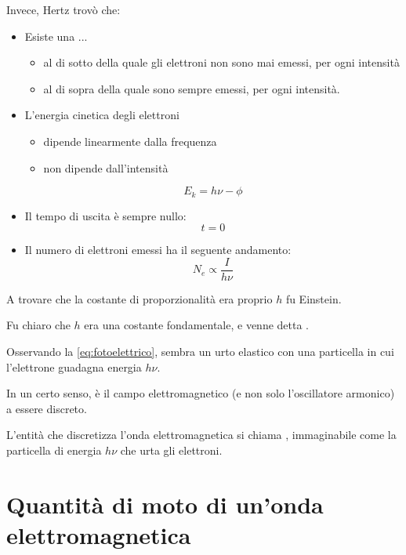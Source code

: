 Invece, Hertz trovò che:
\begin{itemize}
    \item Esiste una ...
    \begin{itemize}
        \item al di sotto della quale gli elettroni non sono mai emessi, per ogni intensità
        \item al di sopra della quale sono sempre emessi, per ogni intensità.
    \end{itemize}
    \item L'energia cinetica degli elettroni
    \begin{itemize}
        \item dipende linearmente dalla frequenza
        \item non dipende dall'intensità
    \end{itemize}
        \begin{equation}
        \label{eq:fotoelettrico}
            E_k = h \nu - \phi
        \end{equation}
    \item Il tempo di uscita è sempre nullo:
        \begin{equation}
            t = 0
        \end{equation}
    \item Il numero di elettroni emessi ha il seguente andamento:
        \begin{equation}
            N_e \propto \frac{I}{h \nu}
        \end{equation}
\end{itemize}

A trovare che la costante di proporzionalità era proprio $h$ fu Einstein.

Fu chiaro che $h$ era una costante fondamentale, e venne detta .

Osservando la \eqref{eq:fotoelettrico}, sembra un urto elastico con una particella in cui l'elettrone guadagna energia $h \nu$.

In un certo senso, è il campo elettromagnetico (e non solo l'oscillatore armonico) a essere discreto.

L'entità che discretizza l'onda elettromagnetica si chiama , immaginabile come la particella di energia $h \nu$ che urta gli elettroni.

\section{Quantità di moto di un'onda elettromagnetica}

